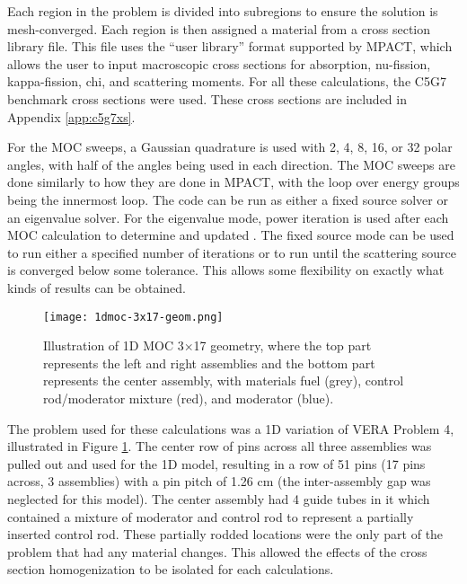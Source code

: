 Each region in the problem is divided into subregions to ensure the solution is mesh-converged.  Each region is then assigned a material from a cross section library file.  This file uses the ``user library'' format supported by MPACT, which allows the user to input macroscopic cross sections for absorption, nu-fission, kappa-fission, chi, and scattering moments.  For all these calculations, the C5G7 benchmark cross sections \cite{EELewisC5G72003,EELewisC5G7extended2005} were used.  These cross sections are included in Appendix \ref{app:c5g7xs}.

For the MOC sweeps, a Gaussian quadrature \cite{HandbookOfMathFunctions1972} is used with 2, 4, 8, 16, or 32 polar angles, with half of the angles being used in each direction.  The MOC sweeps are done similarly to how they are done in MPACT, with the loop over energy groups being the innermost loop.  The code can be run as either a fixed source solver or an eigenvalue solver.  For the eigenvalue mode, power iteration is used after each MOC calculation to determine and updated \keff{}.  The fixed source mode can be used to run either a specified number of iterations or to run until the scattering source is converged below some tolerance.  This allows some flexibility on exactly what kinds of results can be obtained.

\begin{figure}
    \centering
    \texttt{[image: 1dmoc-3x17-geom.png]}
    \caption[Illustration of 1D MOC 3x17 Geometry]{Illustration of 1D MOC 3$\times$17 geometry, where the top part represents the left and right assemblies and the bottom part represents the center assembly, with materials fuel (grey), control rod/moderator mixture (red), and moderator (blue).}\label{f:1dmoc-17x17-geom}
\end{figure}

The problem used for these calculations was a 1D variation of VERA Problem 4, illustrated in Figure \ref{f:1dmoc-17x17-geom}.  The center row of pins across all three assemblies was pulled out and used for the 1D model, resulting in a row of 51 pins (17 pins across, 3 assemblies) with a pin pitch of 1.26 cm (the inter-assembly gap was neglected for this model).  The center assembly had 4 guide tubes in it which contained a mixture of moderator and control rod to represent a partially inserted control rod.  These partially rodded locations were the only part of the problem that had any material changes.  This allowed the effects of the cross section homogenization to be isolated for each calculations.

